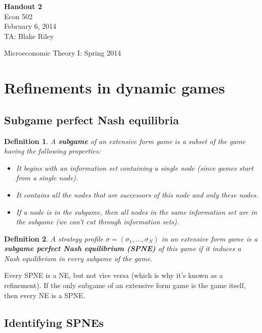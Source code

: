 \documentclass[letter, 11pt]{article}
\theoremstyle{basic}
\newtheorem{definition}{Definition}[section]
\begin{document}
\begin{spacing}{1.0}

\noindent
\textbf{Handout 2} \\
Econ 502 \\
February 6, 2014 \\
TA: Blake Riley \\

\begin{center}
{\Large Microeconomic Theory I: Spring 2014}
\end{center}

\section{Refinements in dynamic games}

\subsection{Subgame perfect Nash equilibria}

\begin{definition}
  A \textbf{subgame} of an extensive form game is a subset of the
  game having the following properties:
  \begin{itemize}
  \item It begins with an information set containing a
    single node (since games start from a single node).
  \item It contains all the nodes that are successors of
    this node and only these nodes.
  \item If a node is in the subgame, then all nodes in
    the same information set are in the subgame (we can't
    cut through information sets).
  \end{itemize}
\end{definition}

\begin{definition}
  A strategy profile $\sigma = (\sigma_1, \ldots, \sigma_N)$ in an
  extensive form game is a \textbf{subgame perfect Nash equilibrium (SPNE)}
  of this game if it induces a Nash equilibrium in every subgame of the
  game.
\end{definition}

Every SPNE is a NE, but not vice versa (which is why it's known as a
refinement). If the only subgame of an extensive form game is the game
itself, then every NE is a SPNE.

\subsection{Identifying SPNEs}


\end{spacing}
\end{document}
